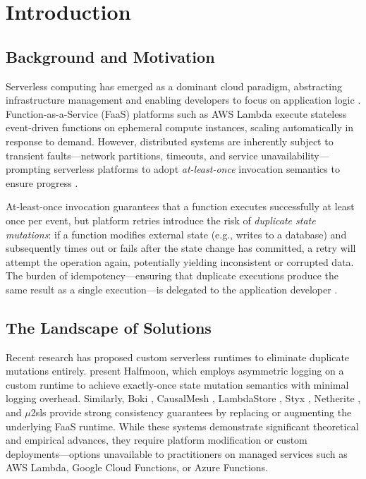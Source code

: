 \chapter{Introduction}

\section{Background and Motivation}

Serverless computing has emerged as a dominant cloud paradigm, abstracting infrastructure management and enabling developers to focus on application logic \citep{Shafiei2022Survey, Wen2023RiseServerless}. Function-as-a-Service (FaaS) platforms such as AWS Lambda execute stateless event-driven functions on ephemeral compute instances, scaling automatically in response to demand. However, distributed systems are inherently subject to transient faults---network partitions, timeouts, and service unavailability---prompting serverless platforms to adopt \textit{at-least-once} invocation semantics to ensure progress \citep{AWSLambdaDocs}.

At-least-once invocation guarantees that a function executes successfully at least once per event, but platform retries introduce the risk of \textit{duplicate state mutations}: if a function modifies external state (e.g., writes to a database) and subsequently times out or fails after the state change has committed, a retry will attempt the operation again, potentially yielding inconsistent or corrupted data. The burden of idempotency---ensuring that duplicate executions produce the same result as a single execution---is delegated to the application developer \citep{Shafiei2022Survey, Wen2023RiseServerless}.

\section{The Landscape of Solutions}

Recent research has proposed custom serverless runtimes to eliminate duplicate mutations entirely. \citet{Qi2025Halfmoon} present Halfmoon, which employs asymmetric logging on a custom runtime to achieve exactly-once state mutation semantics with minimal logging overhead. Similarly, Boki \citep{Jia2024Boki}, CausalMesh \citep{Zhang2024CausalMesh}, LambdaStore \citep{Mast2026LambdaStore}, Styx \citep{Psarakis2025Styx}, Netherite \citep{Burckhardt2022Netherite}, and $\mu$2sls \citep{Kallas2023Mu2sls} provide strong consistency guarantees by replacing or augmenting the underlying FaaS runtime. While these systems demonstrate significant theoretical and empirical advances, they require platform modification or custom deployments---options unavailable to practitioners on managed services such as AWS Lambda, Google Cloud Functions, or Azure Functions.

